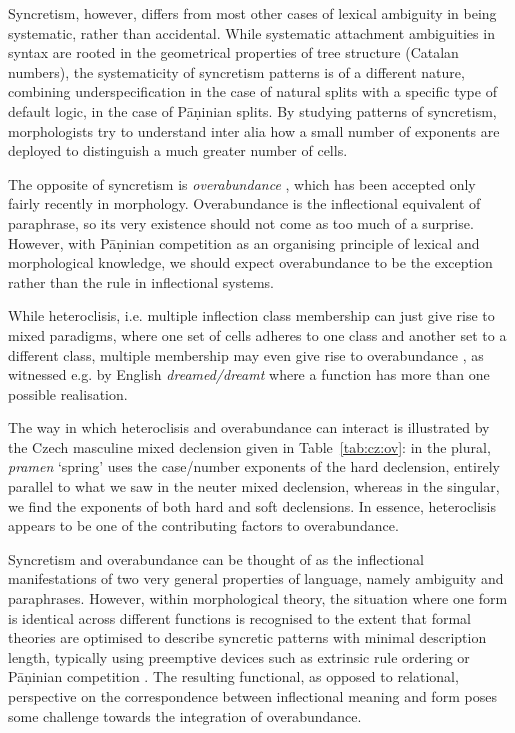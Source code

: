 \documentclass[output=paper]{langscibook}
\begin{document}
Syncretism, however, differs from most other cases of lexical
ambiguity in being systematic, rather than accidental. While
systematic attachment ambiguities in syntax are rooted in the
geometrical properties of tree structure (Catalan numbers), the
systematicity of syncretism patterns is of a different nature,
combining underspecification in the case of natural splits with a
specific type of default logic, in the case of Pāṇinian splits. By
studying patterns of syncretism, morphologists try to understand inter
alia how a small number of exponents are deployed to distinguish a
much greater number of cells.

\begin{sloppypar}
  The opposite of syncretism is \emph{overabundance}
  \citep{Thornton2011,Thornton12,Thornton19}, which has been accepted
  only fairly recently in morphology. Overabundance is the
  inflectional equivalent of paraphrase, so its very existence should
  not come as too much of a surprise. However, with Pāṇinian
  competition as an organising principle of lexical and morphological
  knowledge, we should expect overabundance to be the exception rather
  than the rule in inflectional systems.
\end{sloppypar}

While heteroclisis, i.e. multiple inflection class membership can just
give rise to mixed paradigms, where one set of cells adheres to one
class and another set to a different class, multiple membership may
even give rise to overabundance \citep{Thornton2011}, as witnessed
e.g. by English \textit{dreamed/dreamt} where a function has more than
one possible realisation. 

The way in which heteroclisis and overabundance can interact is
illustrated by the Czech masculine mixed declension given in
Table~\ref{tab:cz:ov}: in the plural, \textit{pramen} `spring' uses
the case/number exponents of the hard declension, entirely parallel to
what we saw in the neuter mixed declension, whereas in the singular,
we find the exponents of both hard and soft declensions. In essence,
heteroclisis appears to be one of the contributing factors to
overabundance.

Syncretism and overabundance can be thought of as the inflectional
manifestations of two very general properties of language, namely
ambiguity and paraphrases. However, within morphological theory, the
situation where one form is identical across different functions is
recognised to the extent that formal theories are optimised to
describe syncretic patterns with minimal description length, typically
using preemptive devices such as extrinsic rule ordering
\citep{Anderson92} or Pāṇinian competition
\citep{Kiparsky05,Stump01,Prince93,Embick07}. The resulting functional, as
opposed to relational, perspective on the correspondence between
inflectional meaning and form poses some challenge towards the
integration of overabundance.
\end{document}

